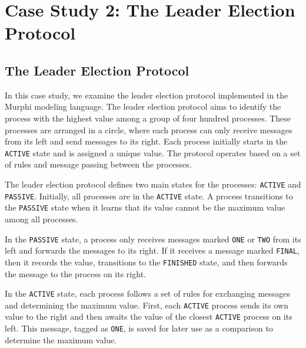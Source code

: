 
\section{Case Study 2: The Leader Election Protocol}\label{sec:leader-election}

\subsection{The Leader Election Protocol}\label{subsec:the-leader-election-protocol}

In this case study, we examine the leader election protocol implemented in
the Murphi modeling language.
The leader election protocol aims to identify the process with the highest
value among a group of four hundred processes.
These processes are arranged in a circle, where each process can only receive
messages from its left and send messages to its right.
Each process initially starts in the \texttt{ACTIVE} state and is assigned a
unique value.
The protocol operates based on a set of rules and message passing between the
processes.

The leader election protocol defines two main states for the processes:
\texttt{ACTIVE} and \texttt{PASSIVE}.
Initially, all processes are in the \texttt{ACTIVE} state.
A process transitions to the \texttt{PASSIVE} state when it learns that its
value cannot be the maximum value among all processes.

In the \texttt{PASSIVE} state, a process only receives messages marked
\texttt{ONE} or \texttt{TWO} from its left and forwards the messages to its
right.
If it receives a message marked \texttt{FINAL}, then it records the value,
transitions to the \texttt{FINISHED} state, and then forwards the message
to the process on its right.

In the \texttt{ACTIVE} state, each process follows a set of rules for
exchanging messages and determining the maximum value.
First, each \texttt{ACTIVE} process sends its own value to the right and then
awaits the value of the closest \texttt{ACTIVE} process on its left.
This message, tagged as \texttt{ONE}, is saved for later use as a comparison
to determine the maximum value.

